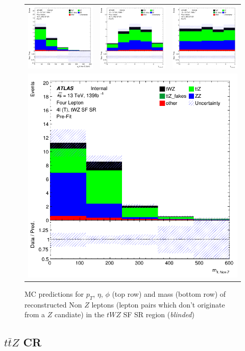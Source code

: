 \begin{figure}[htbp]
\centering
  \begin{tabular}{ccc}

    \includegraphics[width=.2\textwidth]{figures/PreFitPlots/lep4_tWZ_4T_SF_nonZll_sys_pt}&
    \includegraphics[width=.2\textwidth]{figures/PreFitPlots/lep4_tWZ_4T_SF_nonZll_sys_eta} &
    \includegraphics[width=.2\textwidth]{figures/PreFitPlots/lep4_tWZ_4T_SF_nonZll_sys_phi} \\
    \multicolumn{3}{c}{\includegraphics[width=.2\textwidth]{figures/PreFitPlots/lep4_tWZ_4T_SF_nonZll_sys_mass}}

  \end{tabular}
      \caption{MC predictions for $p_{T}$, $\eta$, $\phi$ (top row) and mass (bottom row) of reconstructed Non $Z$ leptons (lepton pairs which don't originate from a $Z$ candiate) in the $tWZ$ SF SR region (\textit{blinded})}
  \label{fig:4lep-SF-SR-NonZLeps-sys-Plots}
\end{figure}



\subsection{$t\bar{t}Z$ CR}
\label{sec:app-controlplotstetralepton-ttZ-CR}

